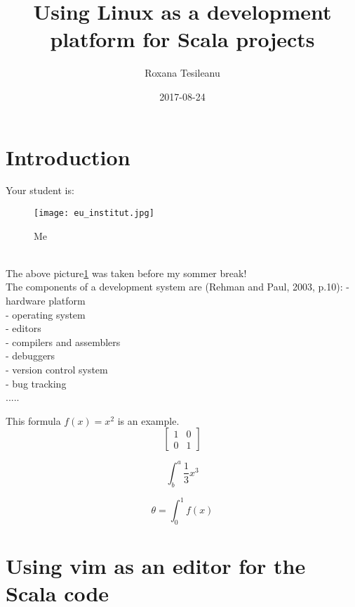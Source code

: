 \documentclass{article}
\title{Using Linux as a development platform for Scala projects}
\date{2017-08-24}
\author{Roxana Tesileanu}
\begin{document}
	\maketitle
	\newpage

\tableofcontents
\newpage

\section{Introduction}

Your student is:\\
\begin{figure} [h!]
 \texttt{[image: eu\_institut.jpg]}
 \caption{Me}
 \label{fig: Roxi}
\end{figure}
\\
The above picture\ref{fig: Roxi}  was taken before my sommer break!
\\

The components of a development system are (Rehman and Paul, 2003, p.10):\newline
- hardware platform \\
- operating system \\
- editors \\
- compilers and assemblers \\
- debuggers \\
- version control system \\
- bug tracking \\

.....

This formula $f(x) = x^2$ is an example.
\begin{equation}
\left[
\begin{matrix}
1 & 0 \\
0 & 1
\end{matrix}
\right]
\end{equation}

\begin{equation}
\int^a_b\frac{1}{3}x^3
\end{equation}

\begin{equation}
\theta = \int^1_0 f(x)
\end{equation}



\section{Using vim as an editor for the Scala code}
\end{document}
